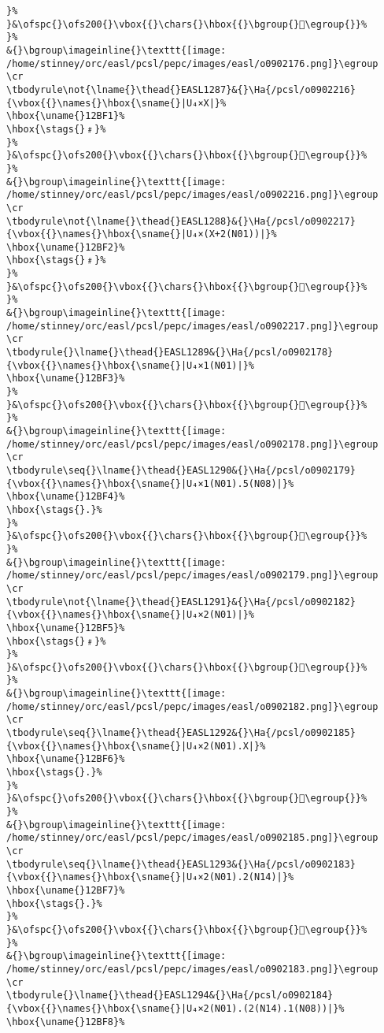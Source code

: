 \begin{verbatim}
}%
}&\ofspc{}\ofs200{}\vbox{{}\chars{}\hbox{{}\bgroup{}𒯰\egroup{}}%
}%
&{}\bgroup\imageinline{}\texttt{[image: /home/stinney/orc/easl/pcsl/pepc/images/easl/o0902176.png]}\egroup
\cr
\tbodyrule\not{\lname{}\thead{}EASL1287}&{}\Ha{/pcsl/o0902216}{\vbox{{}\names{}\hbox{\sname{}|U₄×X|}%
\hbox{\uname{}12BF1}%
\hbox{\stags{}﹟}%
}%
}&\ofspc{}\ofs200{}\vbox{{}\chars{}\hbox{{}\bgroup{}𒯱\egroup{}}%
}%
&{}\bgroup\imageinline{}\texttt{[image: /home/stinney/orc/easl/pcsl/pepc/images/easl/o0902216.png]}\egroup
\cr
\tbodyrule\not{\lname{}\thead{}EASL1288}&{}\Ha{/pcsl/o0902217}{\vbox{{}\names{}\hbox{\sname{}|U₄×(X+2(N01))|}%
\hbox{\uname{}12BF2}%
\hbox{\stags{}﹟}%
}%
}&\ofspc{}\ofs200{}\vbox{{}\chars{}\hbox{{}\bgroup{}𒯲\egroup{}}%
}%
&{}\bgroup\imageinline{}\texttt{[image: /home/stinney/orc/easl/pcsl/pepc/images/easl/o0902217.png]}\egroup
\cr
\tbodyrule{}\lname{}\thead{}EASL1289&{}\Ha{/pcsl/o0902178}{\vbox{{}\names{}\hbox{\sname{}|U₄×1(N01)|}%
\hbox{\uname{}12BF3}%
}%
}&\ofspc{}\ofs200{}\vbox{{}\chars{}\hbox{{}\bgroup{}𒯳\egroup{}}%
}%
&{}\bgroup\imageinline{}\texttt{[image: /home/stinney/orc/easl/pcsl/pepc/images/easl/o0902178.png]}\egroup
\cr
\tbodyrule\seq{}\lname{}\thead{}EASL1290&{}\Ha{/pcsl/o0902179}{\vbox{{}\names{}\hbox{\sname{}|U₄×1(N01).5(N08)|}%
\hbox{\uname{}12BF4}%
\hbox{\stags{}.}%
}%
}&\ofspc{}\ofs200{}\vbox{{}\chars{}\hbox{{}\bgroup{}𒯴\egroup{}}%
}%
&{}\bgroup\imageinline{}\texttt{[image: /home/stinney/orc/easl/pcsl/pepc/images/easl/o0902179.png]}\egroup
\cr
\tbodyrule\not{\lname{}\thead{}EASL1291}&{}\Ha{/pcsl/o0902182}{\vbox{{}\names{}\hbox{\sname{}|U₄×2(N01)|}%
\hbox{\uname{}12BF5}%
\hbox{\stags{}﹟}%
}%
}&\ofspc{}\ofs200{}\vbox{{}\chars{}\hbox{{}\bgroup{}𒯵\egroup{}}%
}%
&{}\bgroup\imageinline{}\texttt{[image: /home/stinney/orc/easl/pcsl/pepc/images/easl/o0902182.png]}\egroup
\cr
\tbodyrule\seq{}\lname{}\thead{}EASL1292&{}\Ha{/pcsl/o0902185}{\vbox{{}\names{}\hbox{\sname{}|U₄×2(N01).X|}%
\hbox{\uname{}12BF6}%
\hbox{\stags{}.}%
}%
}&\ofspc{}\ofs200{}\vbox{{}\chars{}\hbox{{}\bgroup{}𒯶\egroup{}}%
}%
&{}\bgroup\imageinline{}\texttt{[image: /home/stinney/orc/easl/pcsl/pepc/images/easl/o0902185.png]}\egroup
\cr
\tbodyrule\seq{}\lname{}\thead{}EASL1293&{}\Ha{/pcsl/o0902183}{\vbox{{}\names{}\hbox{\sname{}|U₄×2(N01).2(N14)|}%
\hbox{\uname{}12BF7}%
\hbox{\stags{}.}%
}%
}&\ofspc{}\ofs200{}\vbox{{}\chars{}\hbox{{}\bgroup{}𒯷\egroup{}}%
}%
&{}\bgroup\imageinline{}\texttt{[image: /home/stinney/orc/easl/pcsl/pepc/images/easl/o0902183.png]}\egroup
\cr
\tbodyrule{}\lname{}\thead{}EASL1294&{}\Ha{/pcsl/o0902184}{\vbox{{}\names{}\hbox{\sname{}|U₄×2(N01).(2(N14).1(N08))|}%
\hbox{\uname{}12BF8}%

\end{verbatim}
